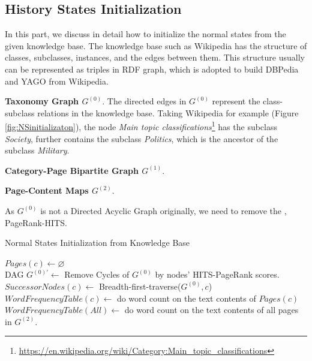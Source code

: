 \documentclass[conference,compsoc]{IEEEtran}
\begin{document}
\subsection{History States Initialization}\label{subsec:hs_initialization}
In this part, we discuss in detail how to initialize the normal states from the given knowledge base. 
The knowledge base such as Wikipedia has the structure of classes, subclasses, instances, and the edges between them. 
This structure usually can be represented as triples in RDF graph\cite{klyne2006rdf}, which is adopted to build DBPedia\cite{auer2007dbpedia} and YAGO\cite{suchanek2007yago} from Wikipedia. 

\textbf{Taxonomy Graph \(G^{(0)}\)}. The directed edges in \(G^{(0)}\) represent the class-subclass relations in the knowledge base. 
Taking Wikipedia for example (Figure \ref{fig:NSinitializaton}), the node \textit{Main topic classifications}\footnote{\url{https://en.wikipedia.org/wiki/Category:Main_topic_classifications}} has the subclass \textit{Society}, further contains the subclass \textit{Politics}, which is the ancestor of the subclass \textit{Military}.

\textbf{Category-Page Bipartite Graph \(G^{(1)}\)}. 

\textbf{Page-Content Maps \(G^{(2)}\)}.

As \(G^{(0)}\) is not a Directed Acyclic Graph originally\cite{faralli2015large}, we need to remove the , PageRank-HITS\cite{Yan:2015wq}. 



\begin{algorithm}
\scriptsize
\caption{Normal States Initialization from Knowledge Base}
\label{alg:normalStatesInit}

\(Pages(c)\leftarrow \varnothing\)\\
DAG \(G^{(0)'} \leftarrow\) Remove Cycles of \(G^{(0)}\) by nodes' HITS-PageRank scores. \\
\(SuccessorNodes(c) \leftarrow \) Breadth-first-traverse(\(G^{(0)},c\))\\
\(WordFrequencyTable(c) \leftarrow \) do word count on the text contents of \(Pages(c)\) \\
\(WordFrequencyTable(All) \leftarrow \) do word count on the text contents of all pages in \(G^{(2)}\).\\
\end{algorithm}
\end{document}
